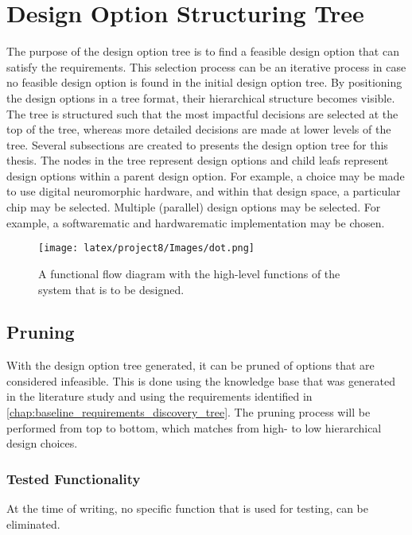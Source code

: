 \chapter{Design Option Structuring Tree}\label{chap:baseline_dot}
The purpose of the design option tree is to find a feasible design option that can satisfy the requirements. This selection process can be an iterative process in case no feasible design option is found in the initial design option tree. By positioning the design options in a tree format, their hierarchical structure becomes visible. The tree is structured such that the most impactful decisions are selected at the top of the tree, whereas more detailed decisions are made at lower levels of the tree. Several subsections are created to   presents the design option tree for this thesis. The nodes in the tree represent design options and child leafs represent design options within a parent design option. For example, a choice may be made to use digital neuromorphic hardware, and within that design space, a particular chip may be selected. Multiple (parallel) design options may be selected. For example, a softwarematic and hardwarematic implementation may be chosen.
\begin{figure}[H]
    \centering
    \texttt{[image: latex/project8/Images/dot.png]}
    \caption{A functional flow diagram with the high-level functions of the system that is to be designed.}
    \label{fig:baseline_dot}
\end{figure}

\section{Pruning}\label{sec:baseline_pruning}
With the design option tree generated, it can be pruned of options that are considered infeasible. This is done using the knowledge base that was generated in the literature study and using the requirements identified in \cref{chap:baseline_requirements_discovery_tree}.  The pruning process will be performed from top to bottom, which matches from high- to low hierarchical design choices.
\subsection{Tested Functionality}\label{subsec:tested_functionality}
At the time of writing, no specific function that is used for testing, can be eliminated.
